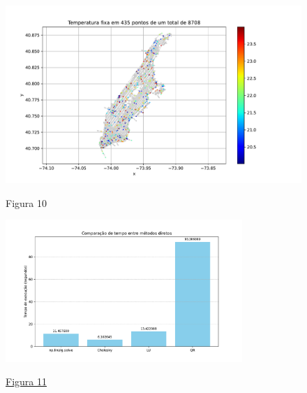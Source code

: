 \documentclass{article}
\begin{document}
    \newpage

    \phantom{}

    \vspace{3cm}

    \begin{figure}[ht]
        \centering
        \includegraphics[width=1\textwidth, trim={5px 10px 55px 25px},clip]{../figs/fig10.pdf}
        
        \LARGE{Figura 10}
    \end{figure}

    \newpage

    \hypertarget{6}{}
    \begin{figure}[ht]
        \centering
        \includegraphics[width=0.8\textwidth, trim={5px 10px 15px 25px},clip]{../figs/fig11.pdf}
        
        \hyperlink{5}{Figura 11}
    \end{figure}

    \vspace{2cm}
\end{document}
